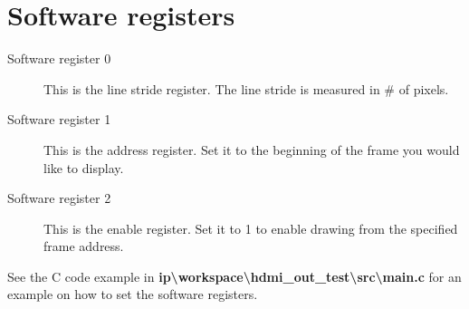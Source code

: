 \documentclass[12pt]{article}
\begin{document}
  \section{Software registers}
  \begin{description}
    \item[Software register 0] This is the line stride register. The line stride is measured in \# of pixels.
    \item[Software register 1] This is the address register. Set it to the beginning of the frame you would like to display.
    \item[Software register 2] This is the enable register. Set it to 1 to enable drawing from the specified frame address.
  \end{description}
  See the C code example in \textbf {ip\textbackslash{}workspace\textbackslash{}hdmi\_out\_test\textbackslash{}src\textbackslash{}main.c} for an example on how to set the software registers.
\end{document}
